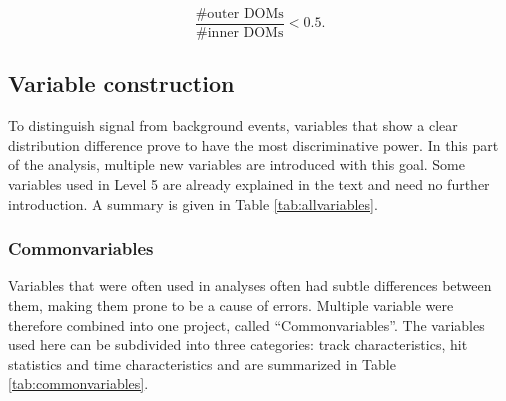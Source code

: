 \begin{equation}
\frac{\# \textrm{outer DOMs}}{\#\textrm{inner DOMs}} < 0.5.
\end{equation}

\subsection{Variable construction}
To distinguish signal from background events, variables that show a clear distribution difference prove to have the most discriminative power. In this part of the analysis, multiple new variables are introduced with this goal. Some variables used in Level 5 are already explained in the text and need no further introduction. A summary is given in Table \ref{tab:allvariables}.

\subsubsection{Commonvariables}
Variables that were often used in analyses often had subtle differences between them, making them prone to be a cause of errors. Multiple variable were therefore combined into one project, called ``Commonvariables''. The variables used here can be subdivided into three categories: track characteristics, hit statistics and time characteristics and are summarized in Table \ref{tab:commonvariables}.

